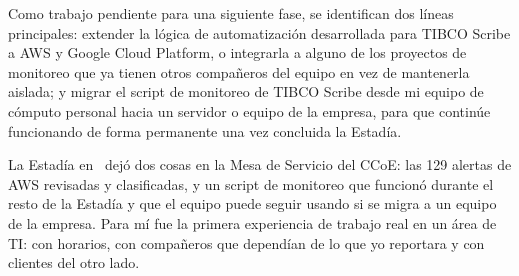 Como trabajo pendiente para una siguiente fase, se identifican dos líneas principales: extender la lógica de automatización desarrollada para TIBCO Scribe a AWS y Google Cloud Platform, o integrarla a alguno de los proyectos de monitoreo que ya tienen otros compañeros del equipo en vez de mantenerla aislada; y migrar el script de monitoreo de TIBCO Scribe desde mi equipo de cómputo personal hacia un servidor o equipo de la empresa, para que continúe funcionando de forma permanente una vez concluida la Estadía.

La Estadía en \UnidadEconomica\ dejó dos cosas en la Mesa de Servicio del CCoE: las 129 alertas de AWS revisadas y clasificadas, y un script de monitoreo que funcionó durante el resto de la Estadía y que el equipo puede seguir usando si se migra a un equipo de la empresa. Para mí fue la primera experiencia de trabajo real en un área de TI: con horarios, con compañeros que dependían de lo que yo reportara y con clientes del otro lado.
